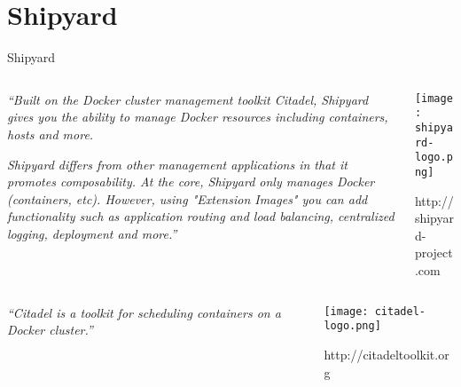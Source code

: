 \documentclass[presentation]{beamer}
\begin{document}
\section{Shipyard}
\label{sec-8}

{
\begin{frame}[label=sec-8-1]{Shipyard}

\begin{columns}
\begin{column}{0.6\textwidth}

\textit{``Built on the Docker cluster management toolkit Citadel, Shipyard gives you the ability to manage Docker resources including containers, hosts and more.}

\textit{Shipyard differs from other management applications in that it promotes composability. At the core, Shipyard only manages Docker (containers, etc). However, using "Extension Images" you can add functionality such as application routing and load balancing, centralized logging, deployment and more.''}
\end{column}

\begin{column}{0.4\textwidth}
\texttt{[image: shipyard-logo.png]}

\small{http://shipyard-project.com}
\end{column}
\end{columns}
\end{frame}
} %

{
\begin{frame}[label=sec-8-2]{}

\begin{columns}
\begin{column}{0.6\textwidth}

\textit{``Citadel is a toolkit for scheduling containers on a Docker cluster.''}
\end{column}

\begin{column}{0.4\textwidth}
\texttt{[image: citadel-logo.png]}

\small{http://citadeltoolkit.org}
\end{column}
\end{columns}
\end{frame}
} %
\end{document}
